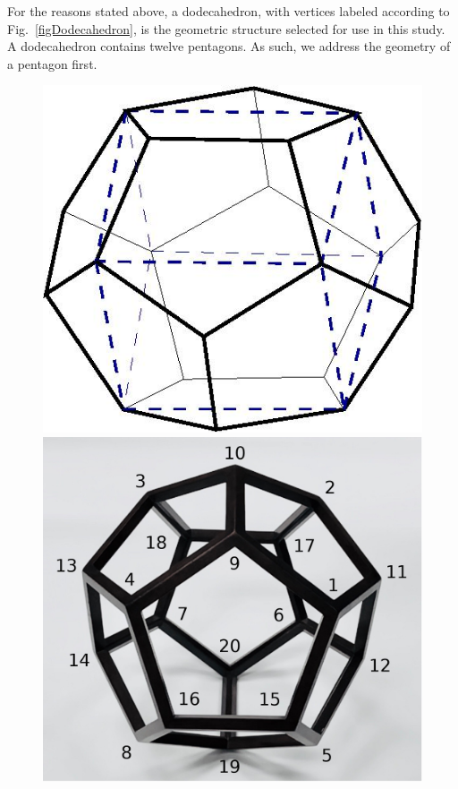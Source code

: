 For the reasons stated above, a dodecahedron, with vertices labeled according to Fig.~\ref{figDodecahedron}, is the geometric structure selected for use in this study.
A dodecahedron contains twelve pentagons.  As such, we address the geometry of a pentagon first.  

\begin{figure}
	{\par\centering
		\resizebox*{0.45\textwidth}{0.3\textheight}
		{\includegraphics{figures/dodecahedron.jpg}} 
		\resizebox*{0.45\textwidth}{0.3\textheight}
		{\includegraphics{figures/dodecahedronVertices.jpg}}
}
\end{figure}
